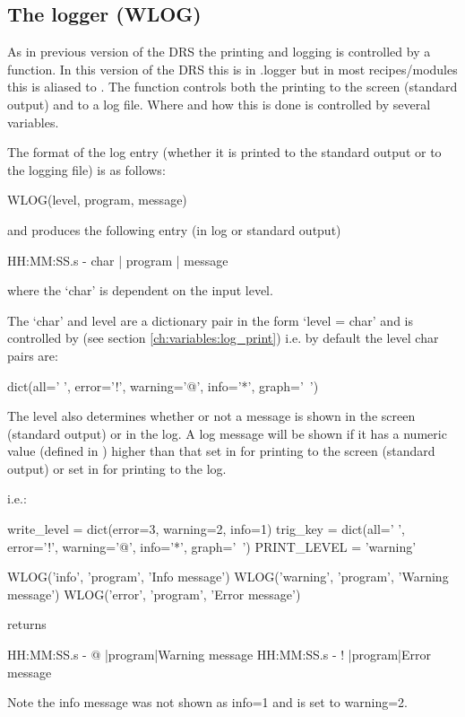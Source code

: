 \clearpage
\newpage
\subsection{The logger (WLOG)}
\label{ch:rules:drs_specific:logger}

As in previous version of the DRS the printing and logging is controlled by a function. In this version of the DRS this is in \spirouLog.logger but in most recipes/modules this is aliased to \WLOG. The \WLOG function controls both the printing to the screen (standard output) and to a log file. Where and how this is done is controlled by several variables.

The format of the log entry (whether it is printed to the standard output or to the logging file) is as follows:
\begin{pythonbox}
WLOG(level, program, message)
\end{pythonbox}
\noindent and produces the following entry (in log or standard output)
\begin{cmdboxprint}
HH:MM:SS.s - char | program | message
\end{cmdboxprint}
\noindent where the `char' is dependent on the input level. 

\noindent The `char' and level are a dictionary pair in the form `level = char' and is controlled by  (see section \ref{ch:variables:log_print}) i.e. by default the level char pairs are:
\begin{pythonbox}
dict(all=' ', error='!', warning='@', info='*', graph='~')
\end{pythonbox}

\noindent The level also determines whether or not a message is shown in the screen (standard output) or in the log. A log message will be shown if it has a numeric value (defined in ) higher than that set in  for printing to the screen (standard output) or set in  for printing to the log.

i.e.: 
\begin{pythonbox}
write_level = dict(error=3, warning=2, info=1)
trig_key = dict(all=' ', error='!', warning='@', info='*', graph='~')
PRINT_LEVEL = 'warning'

WLOG('info', 'program', 'Info message')
WLOG('warning', 'program', 'Warning message')
WLOG('error', 'program', 'Error message')
\end{pythonbox}
returns
\begin{cmdboxprint}
HH:MM:SS.s - @ |program|Warning message
HH:MM:SS.s - ! |program|Error message
\end{cmdboxprint}
\begin{note}
Note the info message was not shown as info=1 and  is set to warning=2.
\end{note}

